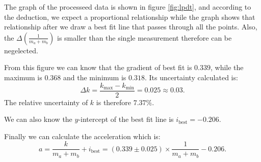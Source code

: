 \documentclass{article}
\begin{document}
The graph of the processeed data is shown in figure \ref{fig:lpdt}, and according to the deduction, we expect a proportional relationship while the graph shows that relationship
after we draw a best fit line that passes through all the points.
Also, the $\Delta \left( \frac{1}{m_a + m_b} \right)$ is smaller than the single measurement therefore can be negelected.

From this figure we can know that the gradient of best fit is $0.339$, while the maximum is $0.368$ and the minimum is $0.318$.
Its uncertainty calculated is:
\[
  \Delta k = \frac{k_\text{max} - k_\text{min}}{2} = 0.025 \approx 0.03.
\]
The relative uncertainty of $k$ is therefore $7.37\%$.

We can also know the $y$-intercept of the best fit line is $i_\text{best} = -0.206$.

Finally we can calculate the acceleration which is:
\[
  a = \frac{k}{m_a + m_b} + i_\text{best} = (0.339 \pm 0.025) \times \frac{1}{m_a + m_b} - 0.206.
\]
\end{document}
